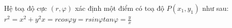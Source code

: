 \documentclass[preview]{standalone}
\begin{document}
\begin{center}
Hệ toạ độ cực $(r,\varphi)$ xác định một điểm có toạ độ $P(x_1, y_1)$ như sau:$r^2=x^2+y^2$$x=rcos\varphi$$y=rsin\varphi$$tan\varphi=\frac{y}{x}$
\end{center}
\end{document}
